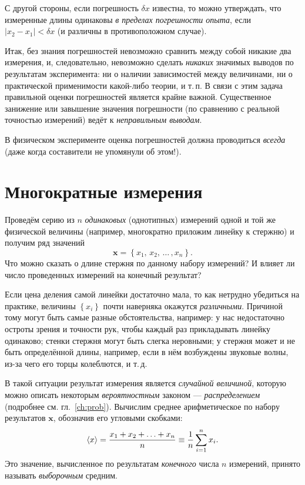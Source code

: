 С другой стороны, если погрешность $\delta x$ известна, то можно
утверждать, что измеренные длины одинаковы
\emph{в пределах погрешности опыта}, если $|x_{2}-x_{1}|<\delta x$
(и различны в противоположном случае).

Итак, без знания погрешностей невозможно сравнить между собой никакие
два измерения, и, следовательно, невозможно сделать \emph{никаких}
значимых выводов по результатам эксперимента: ни о наличии зависимостей
между величинами, ни о практической применимости какой-либо теории,
и т.\,п. В связи с этим задача правильной оценки погрешностей является крайне
важной. Существенное занижение или завышение значения погрешности
(по сравнению с реальной точностью измерений) ведёт к \emph{неправильным выводам}.

В физическом эксперименте оценка погрешностей должна проводиться \emph{всегда}
(даже когда составители  не упомянули об этом!).

\section{Многократные измерения}

Проведём серию из $n$ \emph{одинаковых} (однотипных) измерений одной
и той же физической величины (например, многократно приложим линейку к стержню) и получим
ряд значений
\[
\mathbf{x} = \left\{ x_{1},\,x_{2},\,\ldots\,,x_{n}\right\} .
\]
Что можно сказать о длине стержня по данному набору измерений?
И влияет ли число проведенных измерений на конечный результат?

Если цена деления самой линейки достаточно мала, то как нетрудно убедиться
на практике, величины $\left\{ x_{i}\right\}$ почти наверняка окажутся
\emph{различными}. Причиной тому могут быть
самые разные обстоятельства, например: у нас недостаточно остроты
зрения и точности рук, чтобы каждый раз прикладывать линейку одинаково;
стенки стержня могут быть слегка неровными; у стержня может и не быть
определённой длины, например, если в нём возбуждены звуковые волны,
из-за чего его торцы колеблются, и т.\,д.

В такой ситуации результат измерения является \emph{случайной величиной}, 
которую можно описать некоторым \emph{вероятностным} законом ---
\emph{распределением} (подробнее см. гл.~\ref{ch:prob}). Вычислим среднее арифметическое по набору результатов $\mathbf{x}$,
обозначив его угловыми скобками:
\begin{equation}
 \left<x\right>=\frac{x_{1}+x_{2}+\ldots+x_{n}}{n}\equiv\frac{1}{n}\sum\limits
_{i=1}^{n}x_{i}\label{eq:average}.
\end{equation}
Это значение, вычисленное по результатам \emph{конечного} числа $n$ измерений,
принято называть \emph{выборочным} средним.

